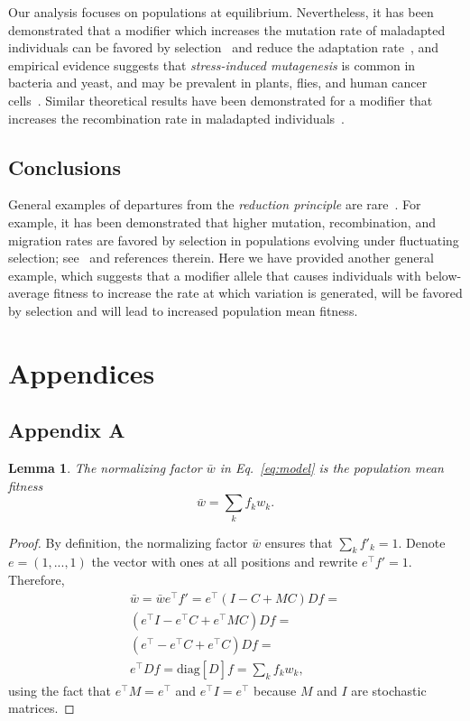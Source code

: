 \documentclass[9pt, a4paper, twocolumn]{extarticle}
\newcommand*{\tr}{^\intercal}
\newcommand{\matrx}[1]{{\left[ \stackrel{}{#1}\right]}}
\newcommand{\diag}[1]{\mbox{diag}\matrx{#1}}
\newtheorem{lemma}{Lemma}
\begin{document}
Our analysis focuses on populations at equilibrium.
Nevertheless, it has been demonstrated that a modifier which increases the mutation rate of maladapted individuals can be favored by selection~\citep{Ram2012} and reduce the adaptation rate~\citep{Ram2014},
and empirical evidence suggests that \emph{stress-induced mutagenesis} is common in bacteria and yeast, and may be prevalent in plants, flies, and human cancer cells~\citep{Rosenberg2012,Fitzgerald2017b}.
Similar theoretical results have been demonstrated for a modifier that increases the recombination rate in maladapted individuals~\citep{Hadany2003a,Hadany2003b}.

\subsection*{Conclusions}

General examples of departures from the \emph{reduction principle} are rare~\citep{Altenberg2017}.
For example, it has been demonstrated that higher mutation, recombination, and migration rates are favored by selection in populations evolving under fluctuating selection; see~\citet{Carja2014} and references therein.
Here we have provided another general example, which suggests that a modifier allele that causes individuals with below-average fitness to increase the rate at which variation is generated, will be favored by selection and will lead to increased population mean fitness.

\section*{Appendices}
\subsection*{Appendix A}\label{sec:AppA}

\begin{lemma}
The normalizing factor $\bar{w}$ in Eq.~\ref{eq:model} is the population mean fitness
\begin{equation}
\bar{w} = \sum_k{f_k w_k}.
\end{equation}
\end{lemma}

\begin{proof}
By definition, the normalizing factor $\bar{w}$ ensures that $\sum_k{f'_k}=1$.
Denote $e = (1, ..., 1)$ the vector with ones at all positions and rewrite $e\tr f' = 1$.
Therefore, 
\begin{multline}\label{eq:mean_fitness}
\bar{w} = 
\bar{w} e\tr f' = 
e\tr (I - C + M C) D f = \\
(e\tr I - e\tr C + e\tr M C) D f = \\
(e\tr - e\tr C + e\tr C) D f = \\
e\tr D f = 
\diag{D} f = 
\sum_k{f_k w_k},
\end{multline}
using the fact that $e\tr M = e\tr$ and $e\tr I = e\tr$ because $M$ and $I$ are stochastic matrices.
\end{proof}
\end{document}

